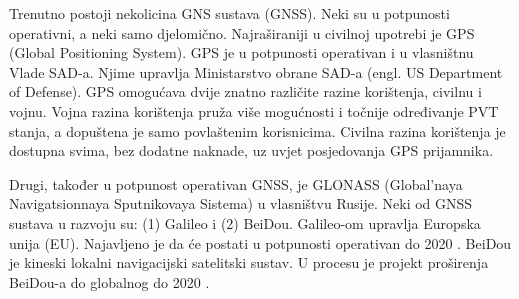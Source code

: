 \documentclass[a4paper,twoside,12pt]{memoir} %
\begin{document}
\begin{intro}
\begin{figure}[H]
	\end{figure}
	
	Trenutno postoji nekolicina GNS sustava (GNSS). Neki su u potpunosti 
	operativni, a neki samo djelomično.
	Najraširaniji u civilnoj upotrebi je GPS (Global Positioning System).
	GPS je u potpunosti operativan i u vlasništnu Vlade SAD-a. Njime upravlja Ministarstvo obrane SAD-a (engl. US Department of Defense).
	GPS omogućava dvije znatno različite razine korištenja, civilnu i vojnu.
	Vojna razina korištenja pruža više mogućnosti i točnije određivanje PVT stanja, a dopuštena je samo povlaštenim 
	korisnicima. Civilna razina korištenja je dostupna svima, bez dodatne naknade, uz uvjet posjedovanja GPS prijamnika. 
	
	Drugi, također u potpunost operativan GNSS, je GLONASS (Global'naya Navigatsionnaya Sputnikovaya Sistema) u vlasništvu Rusije.
	Neki od GNSS sustava u razvoju su: (1) Galileo i (2) BeiDou.
	Galileo-om upravlja Europska unija (EU). Najavljeno je da će postati u potpunosti operativan do 2020 \cite{ref:34}.
	BeiDou je kineski lokalni navigacijski satelitski sustav. U procesu je projekt proširenja BeiDou-a do globalnog do 2020 \cite{ref:34}.
	

\end{intro}
\end{document}
